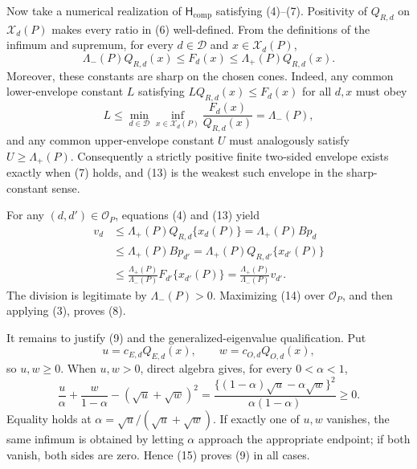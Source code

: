 Now take a numerical realization of \(\mathsf H_{\mathrm{comp}}\) satisfying (4)--(7).  Positivity of \(Q_{R,d}\) on \(\mathcal X_d(P)\) makes every ratio in (6) well-defined.  From the definitions of the infimum and supremum, for every \(d\in\mathcal D\) and \(x\in\mathcal X_d(P)\),
\[
 \Lambda_-(P)Q_{R,d}(x)
 \le F_d(x)
 \le\Lambda_+(P)Q_{R,d}(x).                                \tag{13}
\]
Moreover, these constants are sharp on the chosen cones.  Indeed, any common lower-envelope constant \(L\) satisfying \(LQ_{R,d}(x)\le F_d(x)\) for all \(d,x\) must obey
\[
 L\le\min_{d\in\mathcal D}\inf_{x\in\mathcal X_d(P)}
       \frac{F_d(x)}{Q_{R,d}(x)}=\Lambda_-(P),
\]
and any common upper-envelope constant \(U\) must analogously satisfy \(U\ge\Lambda_+(P)\).  Consequently a strictly positive finite two-sided envelope exists exactly when (7) holds, and (13) is the weakest such envelope in the sharp-constant sense.

For any \((d,d')\in\mathcal O_P\), equations (4) and (13) yield
\[
\begin{aligned}
 v_d
 &\le\Lambda_+(P)Q_{R,d}\{x_d(P)\}
   =\Lambda_+(P)Bp_d\\
 &\le\Lambda_+(P)Bp_{d'}
   =\Lambda_+(P)Q_{R,d'}\{x_{d'}(P)\}\\
 &\le\frac{\Lambda_+(P)}{\Lambda_-(P)}
       F_{d'}\{x_{d'}(P)\}
   =\frac{\Lambda_+(P)}{\Lambda_-(P)}v_{d'}.
\end{aligned}                                                \tag{14}
\]
The division is legitimate by \(\Lambda_-(P)>0\).  Maximizing (14) over \(\mathcal O_P\), and then applying (3), proves (8).

It remains to justify (9) and the generalized-eigenvalue qualification.  Put
\[
 u=c_{E,d}Q_{E,d}(x),
 \qquad
 w=c_{O,d}Q_{O,d}(x),
\]
so \(u,w\ge0\).  When \(u,w>0\), direct algebra gives, for every \(0<\alpha<1\),
\[
 \frac{u}{\alpha}+\frac{w}{1-\alpha}
 -(\sqrt u+\sqrt w)^2
 =\frac{\{(1-\alpha)\sqrt u-\alpha\sqrt w\}^2}
        {\alpha(1-\alpha)}\ge0.                              \tag{15}
\]
Equality holds at \(\alpha=\sqrt u/(\sqrt u+\sqrt w)\).  If exactly one of \(u,w\) vanishes, the same infimum is obtained by letting \(\alpha\) approach the appropriate endpoint; if both vanish, both sides are zero.  Hence (15) proves (9) in all cases.

